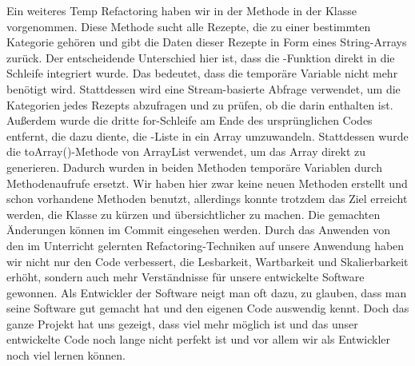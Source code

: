 Ein weiteres Temp Refactoring haben wir in der Methode  in der Klasse  vorgenommen. Diese Methode sucht alle Rezepte, die zu einer bestimmten Kategorie gehören und gibt die Daten dieser Rezepte in Form eines String-Arrays zurück. Der entscheidende Unterschied hier ist, dass die -Funktion direkt in die Schleife integriert wurde. Das bedeutet, dass die temporäre Variable  nicht mehr benötigt wird. Stattdessen wird eine Stream-basierte Abfrage verwendet, um die Kategorien jedes Rezepts abzufragen und zu prüfen, ob die  darin enthalten ist.
Außerdem wurde die dritte for-Schleife am Ende des ursprünglichen Codes entfernt, die dazu diente, die -Liste in ein Array umzuwandeln. Stattdessen wurde die toArray()-Methode von ArrayList verwendet, um das Array direkt zu generieren. 
Dadurch wurden in beiden Methoden temporäre Variablen durch Methodenaufrufe ersetzt. Wir haben hier zwar keine neuen Methoden erstellt und schon vorhandene Methoden benutzt, allerdings konnte trotzdem das Ziel erreicht werden, die Klasse zu kürzen und übersichtlicher zu machen. Die gemachten Änderungen können im Commit \href{https://github.com/MichaelaHaag/RezeptApp/commit/4e0bedc859ba644d448fe4c89a3a6e1320519593}{} eingesehen werden. 
Durch das Anwenden von den im Unterricht gelernten Refactoring-Techniken auf unsere Anwendung haben wir nicht nur den Code verbessert, die Lesbarkeit, Wartbarkeit und Skalierbarkeit erhöht, sondern auch mehr Verständnisse für unsere entwickelte Software gewonnen. Als Entwickler der Software neigt man oft dazu, zu glauben, dass man seine Software gut gemacht hat und den eigenen Code auswendig kennt. Doch das ganze Projekt hat uns gezeigt, dass viel mehr möglich ist und das unser entwickelte Code noch lange nicht perfekt ist und vor allem wir als Entwickler noch viel lernen können. 
